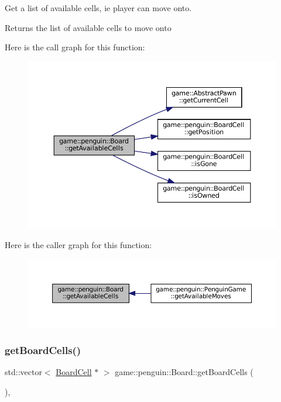 Get a list of available cells, ie player can move onto. 

\begin{DoxyReturn}{Returns}
the list of available cells to move onto 
\end{DoxyReturn}
Here is the call graph for this function\+:
\nopagebreak
\begin{figure}[H]
\begin{center}
\leavevmode
\includegraphics[width=350pt]{classgame_1_1penguin_1_1_board_a26bc6f1c2da1197d9b68f9b4c4e3126b_cgraph}
\end{center}
\end{figure}
Here is the caller graph for this function\+:
\nopagebreak
\begin{figure}[H]
\begin{center}
\leavevmode
\includegraphics[width=350pt]{classgame_1_1penguin_1_1_board_a26bc6f1c2da1197d9b68f9b4c4e3126b_icgraph}
\end{center}
\end{figure}
\mbox{\label{classgame_1_1penguin_1_1_board_afae3ac9e82200303d28dd4cf7bfa12ec}} 
\subsubsection{\texorpdfstring{get\+Board\+Cells()}{getBoardCells()}}
{\footnotesize\ttfamily std\+::vector$<$ \hyperlink{classgame_1_1penguin_1_1_board_cell}{Board\+Cell} $\ast$ $>$ game\+::penguin\+::\+Board\+::get\+Board\+Cells (\begin{DoxyParamCaption}{ }\end{DoxyParamCaption})\hspace{0.3cm}{\ttfamily [override]}, {\ttfamily [virtual]}}




